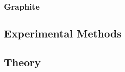 \documentclass[aps,reprint,superscriptaddress]{revtex4-2}
\begin{document}
\subsubsection{Graphite}
\subsection{Experimental Methods}
\subsection{Theory}

\nocite{*}





\vfill
\end{document}
